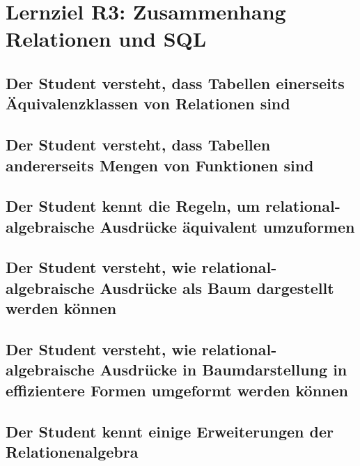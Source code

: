 \section{Lernziel R3: Zusammenhang Relationen und SQL}

\subsection{Der Student versteht, dass Tabellen einerseits Äquivalenzklassen von Relationen sind}

\subsection{Der Student versteht, dass Tabellen andererseits Mengen von Funktionen sind}

\subsection{Der Student kennt die Regeln, um relational-algebraische Ausdrücke äquivalent umzuformen}

\subsection{Der Student versteht, wie relational-algebraische Ausdrücke als Baum dargestellt werden können}

\subsection{Der Student versteht, wie relational-algebraische Ausdrücke in Baumdarstellung in effizientere Formen umgeformt werden können}

\subsection{Der Student kennt einige Erweiterungen der Relationenalgebra}